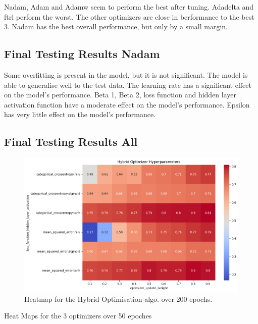 \documentclass[conference]{IEEEtran}
\begin{document}
\newpage

Nadam, Adam and Adamw seem to perform the best after tuning. Adadelta and ftrl perform the worst. The other optimizers are close in berformance to the best 3.
Nadam has the best overall performance, but only by a small margin.

\subsection{Final Testing Results Nadam}

Some overfitting is present in the model, but it is not significant. The model is able to generalise well to the test data.
The learning rate has a significant effect on the model's performance.
Beta 1, Beta 2, loss function and hidden layer activation function have a moderate effect on the model's performance.
Epsilon has very little effect on the model's performance. \cite{b2}

\subsection{Final Testing Results All}

\begin{figure}[htbp]
\centerline{\includegraphics[width=\columnwidth]{F HO GS HM ouw loss ha.png}}
\caption{Heatmap for the Hybrid Optimisation algo. over 200 epochs.}
\label{fig}
\end{figure}

Heat Maps for the 3 optimizers over 50 epoches
\end{document}
